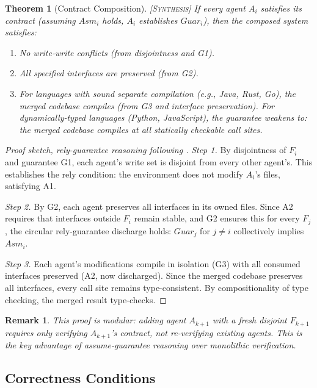 \documentclass[11pt, a4paper, copyright]{googledeepmind}
\newtheorem{theorem}{Theorem}[section]
\newtheorem*{remark}{Remark}
\newcommand{\synthesis}{\textsc{[Synthesis]}}
\begin{document}
\begin{theorem}[Contract Composition] \synthesis{}
\label{thm:composition}
If every agent $A_i$ satisfies its contract (assuming $Asm_i$ holds, $A_i$ establishes $Guar_i$), then the composed system satisfies:
\begin{enumerate}[nosep]
  \item No write-write conflicts (from disjointness and G1).
  \item All specified interfaces are preserved (from G2).
  \item For languages with sound separate compilation (e.g., Java, Rust, Go), the merged codebase compiles (from G3 and interface preservation). For dynamically-typed languages (Python, JavaScript), the guarantee weakens to: the merged codebase compiles at all statically checkable call sites.
\end{enumerate}
\end{theorem}

\begin{proof}[Proof sketch, rely-guarantee reasoning following \citet{Jones1983}]
\textit{Step 1.}
By disjointness of $F_i$ and guarantee G1, each agent's write set is disjoint from every other agent's.
This establishes the rely condition: the environment does not modify $A_i$'s files, satisfying A1.

\textit{Step 2.}
By G2, each agent preserves all interfaces in its owned files.
Since A2 requires that interfaces outside $F_i$ remain stable, and G2 ensures this for every $F_j$, the circular rely-guarantee discharge holds: $Guar_j$ for $j \neq i$ collectively implies $Asm_i$.

\textit{Step 3.}
Each agent's modifications compile in isolation (G3) with all consumed interfaces preserved (A2, now discharged).
Since the merged codebase preserves all interfaces, every call site remains type-consistent.
By compositionality of type checking, the merged result type-checks.
\end{proof}

\begin{remark}
This proof is modular: adding agent $A_{k+1}$ with a fresh disjoint $F_{k+1}$ requires only verifying $A_{k+1}$'s contract, not re-verifying existing agents.
This is the key advantage of assume-guarantee reasoning over monolithic verification.
\end{remark}

\subsection{Correctness Conditions}
\end{document}

